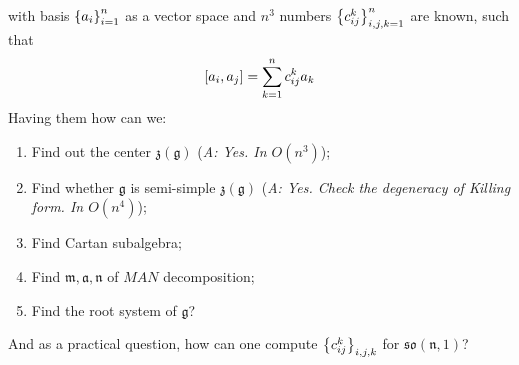 \documentclass[12pt]{article} %
\begin{document}
with basis $\left\{a_i\right\}_{i=1}^n$ as a vector space and $n^3$ numbers $\left\{c_{ij}^k\right\}_{i,j,k=1}^n$ are known, such that
\[\mysbra{a_i,a_j}=\sum_{k=1}^nc_{ij}^ka_k\]
Having them how can we:
\begin{enumerate}
\item Find out the center $\mathfrak{z(g)}$ (\textit{A: Yes. In $O(n^3)$});
\item Find whether $\mathfrak{g}$ is semi-simple $\mathfrak{z(g)}$ (\textit{A: Yes. Check the degeneracy of Killing form. In $O(n^4)$});
\item Find Cartan subalgebra;
\item Find $\mathfrak{m},\mathfrak{a},\mathfrak{n}$ of $MAN$ decomposition;
\item Find the root system of $\mathfrak{g}$?
\end{enumerate}
And as a practical question, how can one compute $\left\{c_{ij}^k\right\}_{i,j,k}$ for $\mathfrak{so(n,1)}$?
\end{document}
